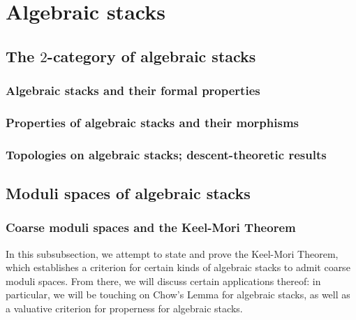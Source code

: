 \section{Algebraic stacks}
    \subsection{The \texorpdfstring{$2$}{}-category of algebraic stacks}
        \subsubsection{Algebraic stacks and their formal properties}
            
    
        \subsubsection{Properties of algebraic stacks and their morphisms}
        
        \subsubsection{Topologies on algebraic stacks; descent-theoretic results}
    
    \subsection{Moduli spaces of algebraic stacks}
        \subsubsection{Coarse moduli spaces and the Keel-Mori Theorem}
            In this subsubsection, we attempt to state and prove the Keel-Mori Theorem, which establishes a criterion for certain kinds of algebraic stacks to admit coarse moduli spaces. From there, we will discuss certain applications thereof: in particular, we will be touching on Chow's Lemma for algebraic stacks, as well as a valuative criterion for properness for algebraic stacks.
            

